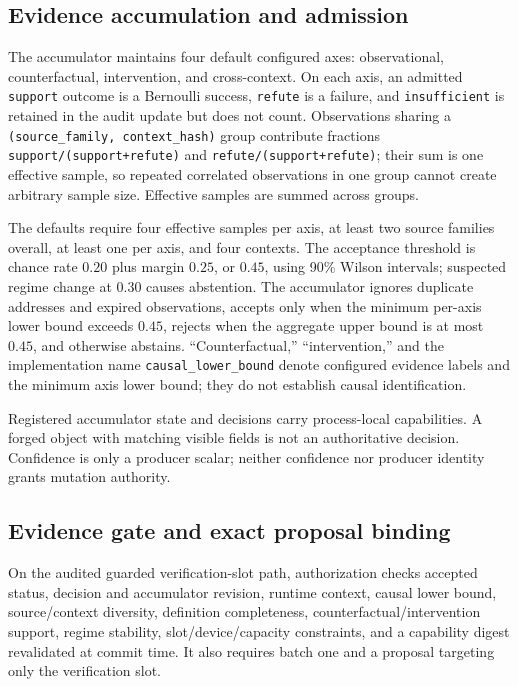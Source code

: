 \documentclass[10pt]{article}
\newcommand{\code}[1]{\texttt{#1}}
\begin{document}
\subsection{Evidence accumulation and admission}

The accumulator maintains four default configured axes: observational, counterfactual, intervention, and cross-context. On each axis, an admitted \texttt{support} outcome is a Bernoulli success, \texttt{refute} is a failure, and \texttt{insufficient} is retained in the audit update but does not count. Observations sharing a \code{(source\_family, context\_hash)} group contribute fractions \code{support/(support+refute)} and \code{refute/(support+refute)}; their sum is one effective sample, so repeated correlated observations in one group cannot create arbitrary sample size. Effective samples are summed across groups.

The defaults require four effective samples per axis, at least two source families overall, at least one per axis, and four contexts. The acceptance threshold is chance rate $0.20$ plus margin $0.25$, or $0.45$, using 90\% Wilson intervals; suspected regime change at $0.30$ causes abstention. The accumulator ignores duplicate addresses and expired observations, accepts only when the minimum per-axis lower bound exceeds $0.45$, rejects when the aggregate upper bound is at most $0.45$, and otherwise abstains. ``Counterfactual,'' ``intervention,'' and the implementation name \code{causal\_lower\_bound} denote configured evidence labels and the minimum axis lower bound; they do not establish causal identification.

Registered accumulator state and decisions carry process-local capabilities. A forged object with matching visible fields is not an authoritative decision. Confidence is only a producer scalar; neither confidence nor producer identity grants mutation authority.

\subsection{Evidence gate and exact proposal binding}
\label{sec:binding}

On the audited guarded verification-slot path, authorization checks accepted status, decision and accumulator revision, runtime context, causal lower bound, source/context diversity, definition completeness, counterfactual/intervention support, regime stability, slot/device/capacity constraints, and a capability digest revalidated at commit time. It also requires batch one and a proposal targeting only the verification slot.
\end{document}

